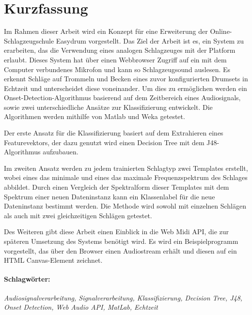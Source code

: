 
\section*{Kurzfassung}
\vspace{0.5cm}

\begin{sloppypar}
Im Rahmen dieser Arbeit wird ein Konzept für eine Erweiterung der Online-Schlagzeugschule Easydrum vorgestellt. Das Ziel der Arbeit ist es, ein System zu erarbeiten, das die Verwendung eines analogen Schlagzeuges mit der Platform erlaubt. Dieses System hat über einen Webbrowser Zugriff auf ein mit dem Computer verbundenes Mikrofon und kann so Schlagzeugsound auslesen. Es erkennt Schläge auf Trommeln und Becken eines zuvor konfigurierten Drumsets in Echtzeit und unterscheidet diese voneinander. Um dies zu ermöglichen werden ein Onset-Detection-Algorithmus basierend auf dem Zeitbereich eines Audiosignals, sowie zwei unterschiedliche Ansätze zur Klassifizierung entwickelt. Die Algorithmen werden mithilfe von Matlab\textsuperscript{\textregistered} und Weka getestet. 
\end{sloppypar}

Der erste Ansatz für die Klassifizierung basiert auf dem Extrahieren eines Featurevektors, der dazu genutzt wird einen Decision Tree mit dem J48-Algorithmus aufzubauen. 

Im zweiten Ansatz werden zu jedem trainierten Schlagtyp zwei Templates erstellt, wobei eines das minimale und eines das maximale Frequenzspektrum des Schlages abbildet. Durch einen Vergleich der Spektralform dieser Templates mit dem Spektrum einer neuen Dateninstanz kann ein Klassenlabel für die neue Dateninstanz bestimmt werden. Die Methode wird sowohl mit einzelnen Schlägen als auch mit zwei gleichzeitigen Schlägen getestet. 

Des Weiteren gibt diese Arbeit einen Einblick in die Web Midi API, die zur späteren Umsetzung des Systems benötigt wird. Es wird ein Beispielprogramm vorgestellt, das über den Browser einen Audiostream erhält und diesen auf ein HTML Canvas-Element zeichnet.

\paragraph{Schlagwörter:}
\textit{Audiosignalverarbeitung, Signalverarbeitung, Klassifizierung, Decision Tree, J48, Onset Detection, Web Audio API, MatLab, Echtzeit}



